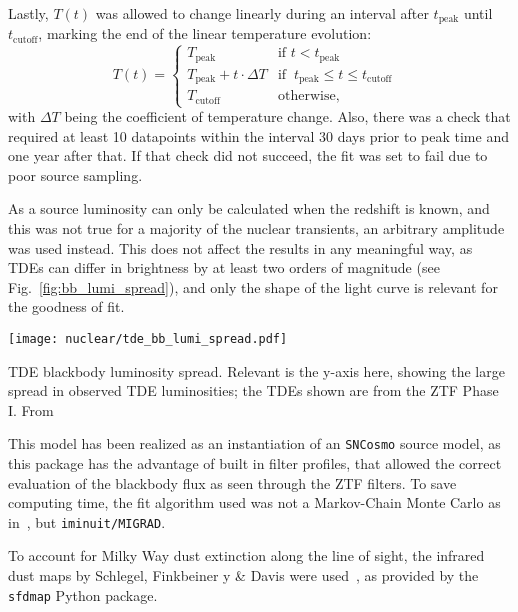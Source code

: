 Lastly, $T(t)$ was allowed to change linearly during an interval after $t_\text{peak}$ until $t_\text{cutoff}$, marking the end of the linear temperature evolution:
\begin{equation}
    T(t) = \begin{cases}
        T_\text{peak}                    & \text{if $t<t_\text{peak}$}                              \\
        T_\text{peak} + t \cdot \Delta T & \text{if $~t_\text{peak} \leq t \leq t_\text{cutoff} $ } \\
        T_\text{cutoff}                  & \text{otherwise},
    \end{cases}
\end{equation}
with $\Delta T$ being the coefficient of temperature change. Also, there was a check that required at least 10 datapoints within the interval 30 days prior to peak time and one year after that. If that check did not succeed, the fit was set to fail due to poor source sampling.

As a source luminosity can only be calculated when the redshift is known, and this was not true for a majority of the nuclear transients, an arbitrary amplitude was used instead. This does not affect the results in any meaningful way, as TDEs can differ in brightness by at least two orders of magnitude (see Fig.~\ref{fig:bb_lumi_spread}), and only the shape of the light curve is relevant for the goodness of fit.\cite{Hammerstein2022}

\begin{marginfigure}
    \texttt{[image: nuclear/tde\_bb\_lumi\_spread.pdf]}
    \caption[TDE blackbody luminosity spread]{TDE blackbody luminosity spread. Relevant is the y-axis here, showing the large spread in observed TDE luminosities; the TDEs shown are from the ZTF Phase I. From~\cite{Hammerstein2022}}
\end{marginfigure}

This model has been realized as an instantiation of an \texttt{SNCosmo} source model, as this package has the advantage of built in filter profiles, that allowed the correct evaluation of the blackbody flux as seen through the ZTF filters. To save computing time, the fit algorithm used was not a Markov-Chain Monte Carlo as in~\cite{Velzen2021a}, but \texttt{iminuit/MIGRAD}.

To account for Milky Way dust extinction along the line of sight, the infrared dust maps by Schlegel, Finkbeiner y \& Davis were used~, as provided by the \texttt{sfdmap} Python package.


